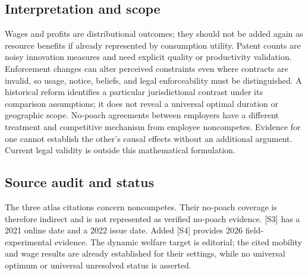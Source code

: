 \documentclass[11pt,a4paper]{article}
\begin{document}
\subsection*{Interpretation and scope}
Wages and profits are distributional outcomes; they should not be added again as resource benefits if already represented by consumption utility. Patent counts are noisy innovation measures and need explicit quality or productivity validation. Enforcement changes can alter perceived constraints even where contracts are invalid, so usage, notice, beliefs, and legal enforceability must be distinguished. A historical reform identifies a particular jurisdictional contrast under its comparison assumptions; it does not reveal a universal optimal duration or geographic scope. No-poach agreements between employers have a different treatment and competitive mechanism from employee noncompetes. Evidence for one cannot establish the other's causal effects without an additional argument. Current legal validity is outside this mathematical formulation.
\subsection*{Source audit and status}
The three atlas citations concern noncompetes. Their no-poach coverage is therefore indirect and is not represented as verified no-poach evidence. [S3] has a 2021 online date and a 2022 issue date. Added [S4] provides 2026 field-experimental evidence. The dynamic welfare target is editorial; the cited mobility and wage results are already established for their settings, while no universal optimum or universal unresolved status is asserted.
\end{document}
